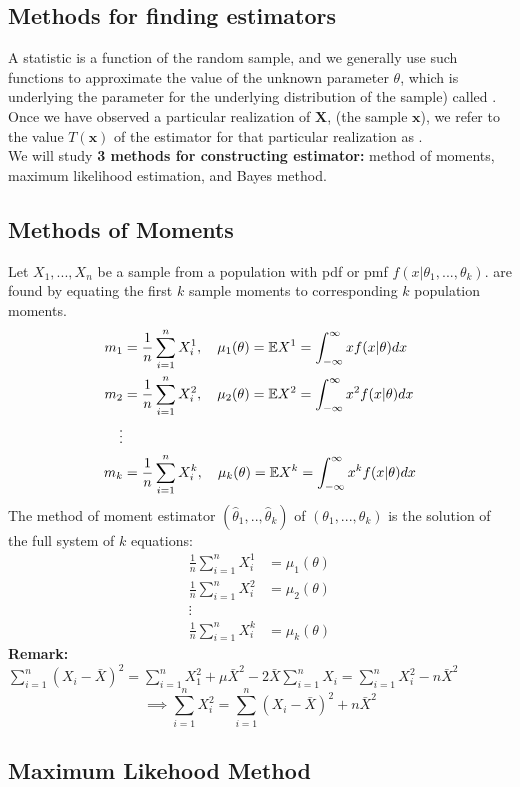 \subsection{Methods for finding estimators}
A statistic is a function of the random sample, and we generally use such functions to approximate the value of the unknown parameter $\theta$, which is underlying the parameter for the underlying distribution of the sample) called . Once we have observed a particular realization of $\boldsymbol{X}$, (the sample $\boldsymbol{x}$), we refer to the value $T(\boldsymbol{x})$ of the estimator for that particular realization as .
\\
We will study \textbf{3 methods for constructing estimator:} method of moments, maximum likelihood estimation, and Bayes method.
\subsection{Methods of Moments}
Let $X_1,...,X_n$ be a sample from a population with pdf or pmf $f(x|\theta_1,...,\theta_k)$.  are found by equating the first $k$ sample moments to corresponding $k$ population moments.
\begin{align*}
    m_1 & = \frac{1}{n}\sum_{i=1}^{n}X_i^1, \quad \mu_1(\theta) = \mathbb E X^1  = \int_{-\infty}^{\infty}xf(x|\theta)dx\\
    m_2 & = \frac{1}{n}\sum_{i=1}^{n}X_i^2, \quad \mu_2(\theta) = \mathbb E X^2= \int_{-\infty}^{\infty}x^2f(x|\theta)dx \\
    \vdots \\ 
    m_k & = \frac{1}{n}\sum_{i=1}^{n}X_i^k, \quad \mu_k(\theta) = \mathbb E X^k = 
    \int_{-\infty}^{\infty}x^kf(x|\theta)dx
\end{align*}
The method of moment estimator $(\hat{\theta}_1,..,\hat{\theta}_k)$ of $(\theta_1,...,\theta_k)$ is the solution of the full system of $k$ equations:
\begin{align*}
    \frac{1}{n}\sum_{i=1}^{n}X_i^1 &= \mu_1(\theta) \\
    \frac{1}{n}\sum_{i=1}^{n}X_i^2 &= \mu_2(\theta) \\
    \vdots \\ 
    \frac{1}{n}\sum_{i=1}^{n}X_i^k &= \mu_k(\theta) 
\end{align*}
\textbf{Remark:} $\sum_{i=1}^{n} (X_i-\bar{X})^2 = \sum_{i=1}^{n}X_1^2 + \mu \bar{X}^2 - 2\bar{X}\sum_{i=1}^{n}X_i = \sum_{i=1}^{n} X_i^2 - n\bar{X}^2$
    $$ \implies \sum_{i=1}^{n}X_i^2 = \sum_{i=1}^{n} (X_i-\bar{X})^2 +n\bar{X}^2$$
\subsection{Maximum Likehood Method}